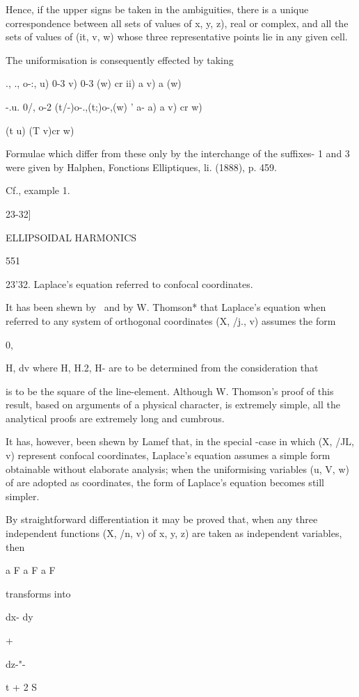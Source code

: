 {{{Hence, if the upper signs be taken in the ambiguities, there is a
unique correspondence between all sets of values of x, y, z), real or
complex, and all the sets of values of (it, v, w) whose three
representative points lie in any given cell.

The uniformisation is consequently effected by taking

., ., o-:, u) 0-3 v) 0-3 (w) cr ii) a v) a (w)

-.u. 0/, o-2 (t/-)o-.,(t;)o-,(w) ' a- a) a v) cr w)

(t u) (T v)cr w)

Formulae which differ from these only by the interchange of the
suffixes- 1 and 3 were given by Halphen, Fonctions Elliptiques, li.
(1888), p. 459.

 Cf., example 1.

23-32]

ELLIPSOIDAL HARMONICS

551

23'32. Laplace's equation referred to confocal coordinates.

It has been shewn by \Lame\ and by W. Thomson* that Laplace's equation
when referred to any system of orthogonal coordinates (X, /j., v)
assumes the form

0,

H, dv where H, H.2, H- are to be determined from the consideration
that

is to be the square of the line-element. Although W. Thomson's proof
of this result, based on arguments of a physical character, is
extremely simple, all the analytical proofs are extremely long and
cumbrous.

It has, however, been shewn by Lamef that, in the special -case in
which (X, /JL, v) represent confocal coordinates, Laplace's equation
assumes a simple form obtainable without elaborate analysis; when the
uniformising variables (u, V, w) of are adopted as
coordinates, the form of Laplace's equation becomes still simpler.

By straightforward differentiation it may be proved that, when any
three independent functions (X, /n, v) of x, y, z) are taken as
independent variables, then

a F a F a F

transforms into

dx- dy

+

dz-"-

t + 2 S

}}}
